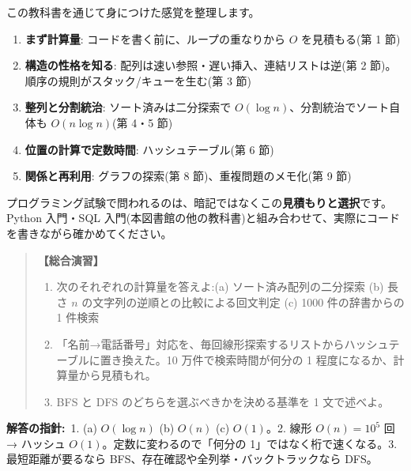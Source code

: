 \documentclass{article}
\begin{document}
この教科書を通じて身につけた感覚を整理します。

\begin{enumerate}
\item \textbf{まず計算量}: コードを書く前に、ループの重なりから \(O\) を見積もる(第 1 節)
\item \textbf{構造の性格を知る}: 配列は速い参照・遅い挿入、連結リストは逆(第 2 節)。順序の規則がスタック/キューを生む(第 3 節)
\item \textbf{整列と分割統治}: ソート済みは二分探索で \(O(\log n)\)、分割統治でソート自体も \(O(n \log n)\)(第 4・5 節)
\item \textbf{位置の計算で定数時間}: ハッシュテーブル(第 6 節)
\item \textbf{関係と再利用}: グラフの探索(第 8 節)、重複問題のメモ化(第 9 節)
\end{enumerate}

プログラミング試験で問われるのは、暗記ではなくこの\textbf{見積もりと選択}です。Python 入門・SQL 入門(本図書館の他の教科書)と組み合わせて、実際にコードを書きながら確かめてください。

\begin{quote}
\textbf{【総合演習】}
\begin{enumerate}
\item 次のそれぞれの計算量を答えよ:(a) ソート済み配列の二分探索 (b) 長さ \(n\) の文字列の逆順との比較による回文判定 (c) 1000 件の辞書からの 1 件検索
\item 「名前→電話番号」対応を、毎回線形探索するリストからハッシュテーブルに置き換えた。10 万件で検索時間が何分の 1 程度になるか、計算量から見積もれ。
\item BFS と DFS のどちらを選ぶべきかを決める基準を 1 文で述べよ。
\end{enumerate}
\end{quote}

\textbf{解答の指針:}\ 1. (a) \(O(\log n)\) (b) \(O(n)\) (c) \(O(1)\)。2. 線形 \(O(n) = 10^5\) 回 → ハッシュ \(O(1)\)。定数に変わるので「何分の 1」ではなく桁で速くなる。3. 最短距離が要るなら BFS、存在確認や全列挙・バックトラックなら DFS。
\end{document}
